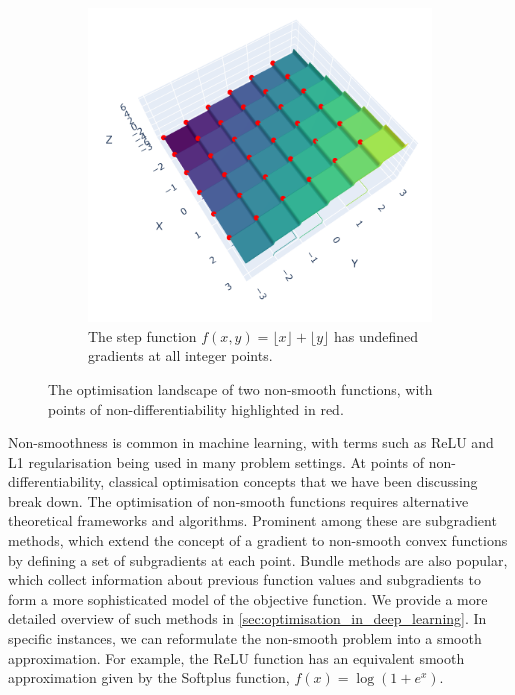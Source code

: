 \begin{figure}[h]
\begin{subfigure}[b]{0.48\linewidth}
        \includegraphics[width=\linewidth]{figures/2background/floor_func.png}
        \caption{The step function
        $f(x,y) = \lfloor x \rfloor + \lfloor y \rfloor$ has undefined gradients at all integer points.}
        \label{fig:step_function}
    \end{subfigure}
    \caption{The optimisation landscape of two non-smooth functions, with points of non-differentiability highlighted in red.}
    \label{fig:non_smooth_functions}
\end{figure}

Non-smoothness is common in machine learning, with terms such as ReLU and L1 regularisation being used in many problem settings. At points of non-differentiability, classical optimisation concepts that we have been discussing break down. The optimisation of non-smooth functions requires alternative theoretical frameworks and algorithms. Prominent among these are subgradient methods, which extend the concept of a gradient to non-smooth convex functions by defining a set of subgradients at each point. Bundle methods are also popular, which collect information about previous function values and subgradients to form a more sophisticated model of the objective function. We provide a more detailed overview of such methods in \cref{sec:optimisation_in_deep_learning}. In specific instances, we can reformulate the non-smooth problem into a smooth approximation. For example, the ReLU function has an equivalent smooth approximation given by the Softplus function, $f(x) = \log(1 + e^x)$.

